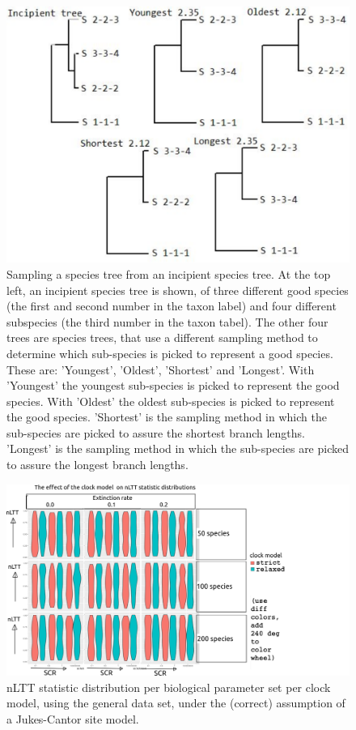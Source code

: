\documentclass{article}
\begin{document}
\begin{figure}[!htbp]
  \includegraphics[width=\textwidth]{fig_sampling_methods.png}
  \caption{
    Sampling a species tree from an incipient species tree. At the top left,
    an incipient species tree is shown, of three different good species (the
    first and second number in the taxon label) and four different subspecies (the
    third number in the taxon tabel). The other four trees are species trees,
    that use a different sampling method to determine which sub-species is picked to
    represent a good species. These are: 'Youngest', 'Oldest', 'Shortest' and
    'Longest'. With 'Youngest' the youngest sub-species is picked to represent the
    good species. With 'Oldest' the oldest sub-species is picked to represent the
    good species. 'Shortest' is the sampling method in which the sub-species are
    picked to assure the shortest branch lengths. 'Longest' is the sampling method 
    in which the sub-species are picked to assure the longest branch lengths.
  }
\end{figure}

\begin{figure}[!htbp]
  \includegraphics[width=\textwidth]{fig_clock_model.png}
  \caption{
    nLTT statistic distribution per biological parameter set per clock model,
    using the general data set, 
    under the (correct) assumption of a Jukes-Cantor site model.
  }
\end{figure}
\end{document}
